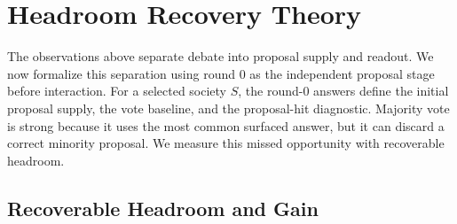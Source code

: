 \section{Headroom Recovery Theory}
\label{sec:headroom_lvd}

The observations above separate debate into proposal supply and readout. We now
formalize this separation using round $0$ as the independent proposal stage
before interaction. For a selected society $S$, the round-0 answers define the
initial proposal supply, the vote baseline, and the proposal-hit diagnostic.
Majority vote is strong because it uses the most common surfaced answer, but it
can discard a correct minority proposal. We measure this missed opportunity with
recoverable headroom.

\subsection{Recoverable Headroom and Gain}
\label{subsec:headroom_accounting}
\label{subsec:recovery_damage_decomposition}

